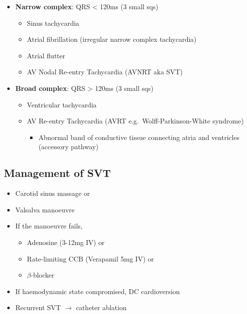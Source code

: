 \documentclass[
  12pt,
]{memoir}
\providecommand{\tightlist}{%
  \setlength{\itemsep}{0pt}\setlength{\parskip}{0pt}}
\begin{document}
\begin{itemize}
\tightlist
\item
  \textbf{Narrow complex}: QRS \textless{} 120ms (3 small sqs)

  \begin{itemize}
  \tightlist
  \item
    Sinus tachycardia
  \item
    Atrial fibrillation (irregular narrow complex tachycardia)
  \item
    Atrial flutter
  \item
    AV Nodal Re-entry Tachycardia (AVNRT aka SVT)
  \end{itemize}
\item
  \textbf{Broad complex}: QRS \textgreater{} 120ms (3 small sqs)

  \begin{itemize}
  \tightlist
  \item
    Ventricular tachycardia
  \item
    AV Re-entry Tachycardia (AVRT e.g.~Wolff-Parkinson-White syndrome)

    \begin{itemize}
    \tightlist
    \item
      Abnormal band of conductive tissue connecting atria and ventricles
      (accessory pathway)
    \end{itemize}
  \end{itemize}
\end{itemize}

\hypertarget{management-of-svt}{%
\subsection{Management of SVT}\label{management-of-svt}}

\begin{itemize}
\tightlist
\item
  Carotid sinus massage or
\item
  Valsalva manoeuvre
\item
  If the manoeuvre fails,

  \begin{itemize}
  \tightlist
  \item
    Adenosine (3-12mg IV) or
  \item
    Rate-limiting CCB (Verapamil 5mg IV) or
  \item
    \(\beta\)-blocker
  \end{itemize}
\item
  If haemodynamic state compromised, DC cardioversion
\item
  Recurrent SVT \(\rightarrow\) catheter ablation
\end{itemize}
\end{document}
